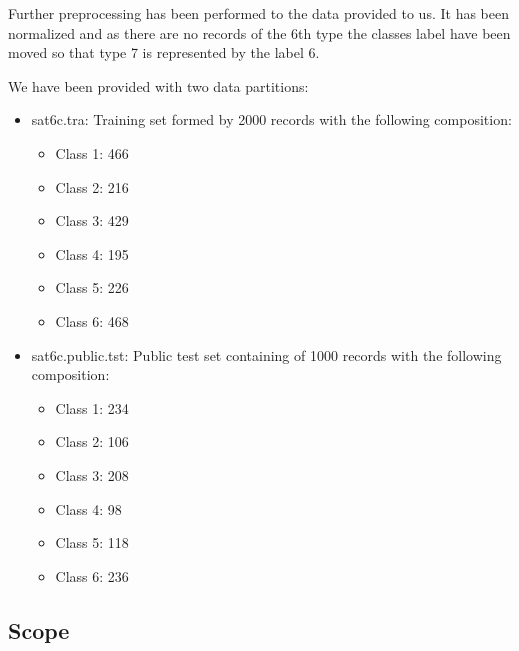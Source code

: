 \documentclass[a4paper,10pt,titlepage]{article}
\begin{document}
\par Further preprocessing has been performed to the data provided to us. It has been normalized and as there are no records of the 6th type the classes label have been moved so that type 7 is represented by the label 6. 

\par We have been provided with two data partitions:
\begin{itemize}
	\item sat6c.tra: Training set formed by 2000 records with the following composition:	
	\begin{itemize}
		\item Class 1: 466
		\item Class 2: 216
		\item Class 3: 429
		\item Class 4: 195
		\item Class 5: 226
		\item Class 6: 468
	\end{itemize}
	\item sat6c.public.tst: Public test set containing of 1000 records with the following composition: 
	\begin{itemize}
		\item Class 1: 234
		\item Class 2: 106
		\item Class 3: 208
		\item Class 4: 98
		\item Class 5: 118
		\item Class 6: 236
	\end{itemize}
\end{itemize}


\subsection{Scope}
\end{document}
